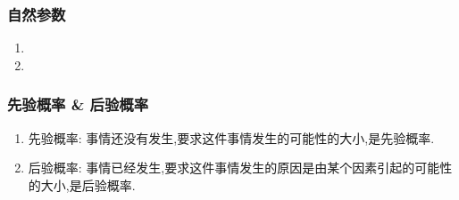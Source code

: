 \subsubsection{自然参数}
\begin{enumerate}
	\item 
	\item 
\end{enumerate}

\subsubsection{先验概率 \& 后验概率}
\begin{enumerate}
	\item 先验概率: 事情还没有发生,要求这件事情发生的可能性的大小,是先验概率. 
	\item 后验概率: 事情已经发生,要求这件事情发生的原因是由某个因素引起的可能性的大小,是后验概率.
\end{enumerate}

